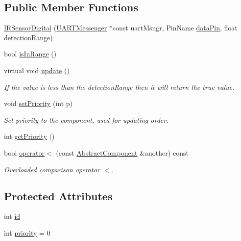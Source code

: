 \subsection*{Public Member Functions}
\begin{DoxyCompactItemize}
\item 
\hyperlink{class_i_r_sensor_digital_a43d7d836d07616260611d3cef709dff1}{I\+R\+Sensor\+Digital} (\hyperlink{class_u_a_r_t_messenger}{U\+A\+R\+T\+Messenger} $\ast$const uart\+Msngr, Pin\+Name \hyperlink{class_i_r_sensor_digital_a4dcc356ed96053c03b4fd247b9ffc928}{data\+Pin}, float \hyperlink{class_i_r_sensor_digital_abb7c9c63c4aa193dd828d0ee56850478}{detection\+Range})
\item 
bool \hyperlink{class_i_r_sensor_digital_a749b91dae3e83900f6de49fcc908470d}{is\+In\+Range} ()
\item 
virtual void \hyperlink{class_i_r_sensor_digital_a8d09a546a1f4b4c6533c324d98a146a9}{update} ()
\begin{DoxyCompactList}\small\item\em If the value is less than the detection\+Range then it will return the true value. \end{DoxyCompactList}\item 
void \hyperlink{class_abstract_component_a58a59a9ea6c3b4c86fb3bf98ff1eaaef}{set\+Priority} (int p)
\begin{DoxyCompactList}\small\item\em Set priority to the component, used for updating order. \end{DoxyCompactList}\item 
int \hyperlink{class_abstract_component_ac0b440d1d642ff1292ec3c544d75a8f1}{get\+Priority} ()
\item 
bool \hyperlink{class_abstract_component_a0c2e458144111c5f599c66f168516abc}{operator$<$} (const \hyperlink{class_abstract_component}{Abstract\+Component} \&another) const
\begin{DoxyCompactList}\small\item\em Overloaded comparison operator \textquotesingle{}$<$\textquotesingle{}. \end{DoxyCompactList}\end{DoxyCompactItemize}
\subsection*{Protected Attributes}
\begin{DoxyCompactItemize}
\item 
int \hyperlink{class_abstract_component_a9c9c548149681b1a1dd935e66ed5dd11}{id}
\item 
int \hyperlink{class_abstract_component_aff57dfa5f31be093a06b55560e33fb95}{priority} = 0
\end{DoxyCompactItemize}
